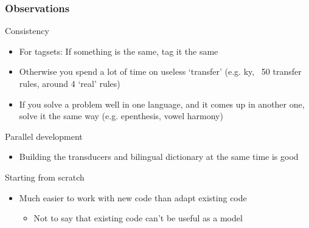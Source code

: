 \documentclass[10pt,xetex]{beamer} %
\begin{document}
\begin{frame}
  \frametitle{Observations}

\begin{block}{Consistency}
  \begin{itemize}
      \item For tagsets: If something is the same, tag it the same
      \item Otherwise you spend a lot of time on useless `transfer'
        (e.g. ky, ~50 transfer rules, around 4 `real' rules)
      \item If you solve a problem well in one language, and it comes up 
        in another one, solve it the same way (e.g. epenthesis, vowel harmony)
  \end{itemize}
\end{block}

\begin{block}{Parallel development}
  \begin{itemize}
    \item Building the transducers and bilingual dictionary at the same time is good
  \end{itemize}
\end{block}

\begin{block}{Starting from scratch}
  \begin{itemize}
    \item Much easier to work with new code than adapt existing code
    \begin{itemize}
      \item Not to say that existing code can't be useful as a model 
    \end{itemize}
  \end{itemize}
\end{block}

\end{frame}

\end{document}
